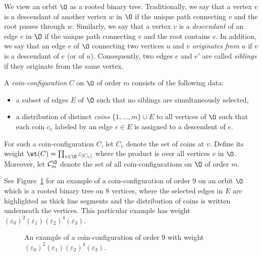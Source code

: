 We view an orbit $\O$ as a rooted binary tree. Traditionally, we say that a vertex $v$ is a descendant of another vertex $w$ in $\O$ if the unique path connecting $v$ and the root passes through $w$. Similarly, we say that a vertex $v$ is a \textit{descendant} of an edge $e$ in $\O$ if the unique path connecting $v$ and the root contains $e$. In addition, we say that an edge $e$ of $\O$ connecting two vertices $u$ and $v$ \textit{originates from} $u$ if $v$ is a descendant of $e$ (or of $u$). Consequently, two edges $e$ and $e'$ are called \textit{siblings} if they originate from the same vertex.
\begin{definition}\label{def:coin}
A \textit{coin-configuration} $C$ on $\O$ of order $m$ consists of the following data:
\begin{itemize}
    \item a subset of edges $E$ of $\O$ such that no siblings are simultaneously selected,
    \item a distribution of distinct \textit{coins} $\{1,\ldots,m\}\cup E$ to all vertices of $\O$ such that each coin $c_e$ labeled by an edge $e\in E$ is assigned to a descendent of $e$.
\end{itemize}
For such a coin-configuration $C$, let $C_v$ denote the set of coins at $v$. Define its weight $\wt(C)=\prod_{v\in\O}\varepsilon_{|C_v|}$ where the product is over all vertices $v$ in $\O$. Moreover, let $\mathcal{C}^{\O}_m$ denote the set of all coin-configurations on $\O$ of order $m$. 
\end{definition}
See Figure~\ref{fig:coin} for an example of a coin-configuration of order 9 on an orbit $\O$ which is a rooted binary tree on 8 vertices, where the selected edges in $E$ are highlighted as thick line segments and the distribution of coins is written underneath the vertices. This particular example has weight $(\varepsilon_0)^2(\varepsilon_1)(\varepsilon_2)^4(\varepsilon_3)$.
\begin{figure}[h!]
\centering
{}
\caption{An example of a coin-configuration of order 9 with weight $(\varepsilon_0)^2(\varepsilon_1)(\varepsilon_2)^4(\varepsilon_3)$.}
\label{fig:coin}
\end{figure}

